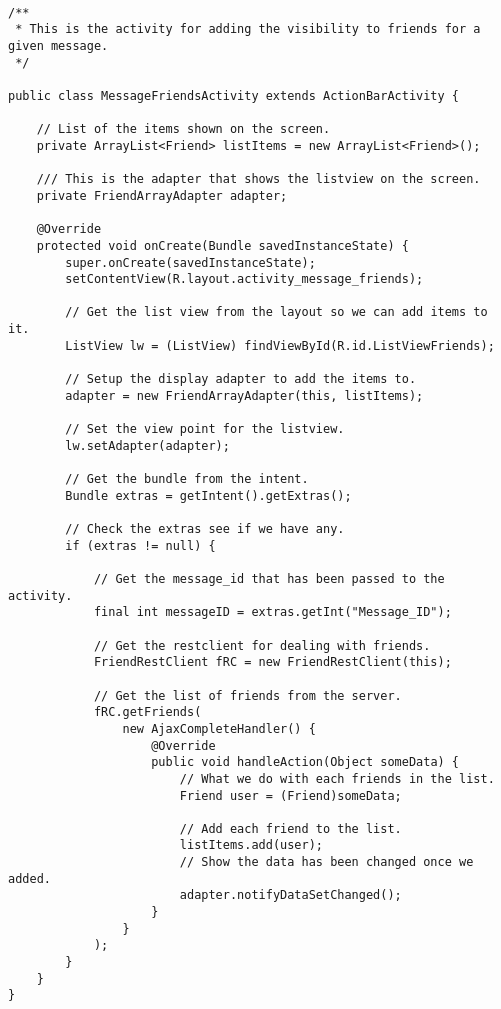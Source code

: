 \begin{lstlisting}

/**
 * This is the activity for adding the visibility to friends for a given message.
 */

public class MessageFriendsActivity extends ActionBarActivity {

    // List of the items shown on the screen.
    private ArrayList<Friend> listItems = new ArrayList<Friend>();

    /// This is the adapter that shows the listview on the screen.
    private FriendArrayAdapter adapter;

    @Override
    protected void onCreate(Bundle savedInstanceState) {
        super.onCreate(savedInstanceState);
        setContentView(R.layout.activity_message_friends);

        // Get the list view from the layout so we can add items to it.
        ListView lw = (ListView) findViewById(R.id.ListViewFriends);

        // Setup the display adapter to add the items to.
        adapter = new FriendArrayAdapter(this, listItems);

        // Set the view point for the listview.
        lw.setAdapter(adapter);

        // Get the bundle from the intent.
        Bundle extras = getIntent().getExtras();

        // Check the extras see if we have any.
        if (extras != null) {

            // Get the message_id that has been passed to the activity.
            final int messageID = extras.getInt("Message_ID");

            // Get the restclient for dealing with friends.
            FriendRestClient fRC = new FriendRestClient(this);

            // Get the list of friends from the server.
            fRC.getFriends(
                new AjaxCompleteHandler() {
                    @Override
                    public void handleAction(Object someData) {
                        // What we do with each friends in the list.
                        Friend user = (Friend)someData;

                        // Add each friend to the list.
                        listItems.add(user);
                        // Show the data has been changed once we added.
                        adapter.notifyDataSetChanged();
                    }
                }
            );
        }
    }
}
\end{lstlisting}

